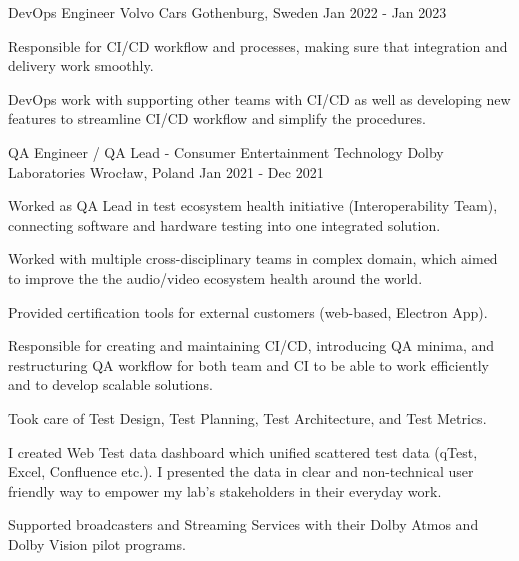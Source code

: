 \begin{cventries}
  \cventry
  {DevOps Engineer} %
  {Volvo Cars} %
  {Gothenburg, Sweden} %
  {Jan 2022 - Jan 2023} %
  {
    \begin{cvitems} %
      \item {Responsible for CI/CD workflow and processes, making sure that integration and delivery work smoothly.}
      \item {DevOps work with supporting other teams with CI/CD as well as developing new features to streamline CI/CD workflow and simplify the procedures.}
    \end{cvitems}
  }

  \cventry
  {QA Engineer / QA Lead - Consumer Entertainment Technology} %
  {Dolby Laboratories} %
  {Wrocław, Poland} %
  {Jan 2021 - Dec 2021} %
  {
    \begin{cvitems} %
      \item {Worked as QA Lead in test ecosystem health initiative (Interoperability Team), connecting software and hardware testing into one integrated solution.}
      \item {Worked with multiple cross-disciplinary teams in complex domain, which aimed to improve the the audio/video ecosystem health around the world.}
      \item {Provided certification tools for external customers (web-based, Electron App).}
      \item {Responsible for creating and maintaining CI/CD, introducing QA minima, and restructuring QA workflow for both team and CI to be able to work efficiently and to develop scalable solutions.}
      \item {Took care of Test Design, Test Planning, Test Architecture, and Test Metrics.}
      \item {I created Web Test data dashboard which unified scattered test data (qTest, Excel, Confluence etc.). I presented the data in clear and non-technical user friendly way to empower my lab's stakeholders in their everyday work.}
      \item {Supported broadcasters and Streaming Services with their Dolby Atmos and Dolby Vision pilot programs.}
    \end{cvitems}
  }


\end{cventries}
